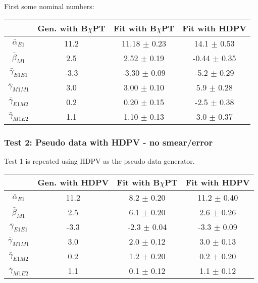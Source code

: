 \documentclass[]{article}
\begin{document}
\noindent First some nominal numbers:
\begin{table}[h!]
	\centering %
	\begin{tabular}{|c|c|c|c|} %
		\hline %
		                      & Gen. with B$\chi$PT & Fit with B$\chi$PT & Fit with HDPV\\
		\hline\hline
		$\bar{\alpha}_{E1}$   & 11.2 & 11.18 $\pm$ 0.23 & 14.1 $\pm$ 0.53 \\
		$\bar{\beta}_{M1}$    & 2.5  & 2.52 $\pm$ 0.19 & -0.44 $\pm$ 0.35 \\
		$\bar{\gamma}_{E1E1}$ & -3.3 & -3.30 $\pm$ 0.09 & -5.2 $\pm$ 0.29 \\
		$\bar{\gamma}_{M1M1}$ & 3.0 & 3.00 $\pm$ 0.10 & 5.9 $\pm$ 0.28 \\
		$\bar{\gamma}_{E1M2}$ & 0.2  & 0.20 $\pm$ 0.15 & -2.5 $\pm$ 0.38 \\
		$\bar{\gamma}_{M1E2}$ & 1.1 & 1.10 $\pm$ 0.13 & 3.0 $\pm$ 0.37 \\[0.5ex]
		\hline
	\end{tabular}
\end{table}

\vspace{10mm}
\subsubsection{Test 2: Pseudo data with HDPV - no smear/error} \label{Sec:Pseudo2}

Test 1 is repeated using HDPV as the pseudo data generator. 

\begin{table}[h!]
	\centering %
	\begin{tabular}{|c|c|c|c|} %
		\hline %
		& Gen. with HDPV & Fit with B$\chi$PT & Fit with HDPV\\
		\hline\hline
		$\bar{\alpha}_{E1}$   & 11.2 & 8.2 $\pm$ 0.20 & 11.2 $\pm$ 0.40 \\
		$\bar{\beta}_{M1}$    & 2.5  & 6.1 $\pm$ 0.20 & 2.6 $\pm$ 0.26 \\
		$\bar{\gamma}_{E1E1}$ & -3.3 & -2.3 $\pm$ 0.04 & -3.3 $\pm$ 0.09 \\
		$\bar{\gamma}_{M1M1}$ & 3.0  & 2.0 $\pm$ 0.12 & 3.0 $\pm$ 0.13 \\
		$\bar{\gamma}_{E1M2}$ & 0.2  & 1.2 $\pm$ 0.20 & 0.2 $\pm$ 0.20 \\
		$\bar{\gamma}_{M1E2}$ & 1.1  & 0.1 $\pm$ 0.12 & 1.1 $\pm$ 0.12 \\[0.5ex]
		\hline
	\end{tabular}
\end{table}
\end{document}
